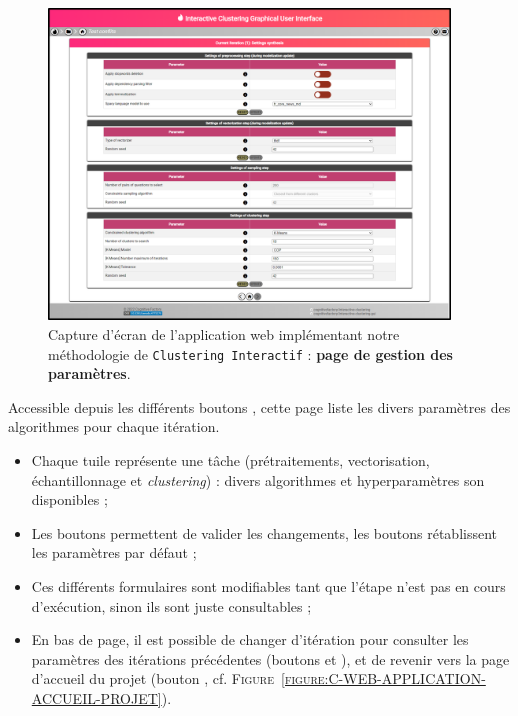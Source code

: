 		\begin{figure}[H]
			\centering
			\includegraphics[width=0.95\textwidth]{figures/interactive-clustering-application-parametres}
			\caption{
				Capture d'écran de l'application web implémentant notre méthodologie de \texttt{Clustering Interactif} : \textbf{page de gestion des paramètres}.
			}
			\label{figure:C-WEB-APPLICATION-PARAMETRAGE}
		\end{figure}
		
		Accessible depuis les différents boutons \textguillemets{\faCog}, cette page liste les divers paramètres des algorithmes pour chaque itération.
		\begin{itemize}
			\item Chaque tuile représente une tâche (prétraitements, vectorisation, échantillonnage et \textit{clustering}) : divers algorithmes et hyperparamètres son disponibles ;
			\item Les boutons  permettent de valider les changements, les boutons  rétablissent les paramètres par défaut ;
			\item Ces différents formulaires sont modifiables tant que l'étape n'est pas en cours d'exécution, sinon ils sont juste consultables ;
			\item En bas de page, il est possible de changer d'itération pour consulter les paramètres des itérations précédentes (boutons \textguillemets{\faAngleLeft} et \textguillemets{\faAngleRight}), et de revenir vers la page d'accueil du projet (bouton \textguillemets{\faHome}, cf. \textsc{Figure~\ref{figure:C-WEB-APPLICATION-ACCUEIL-PROJET}}).
		\end{itemize}
	
